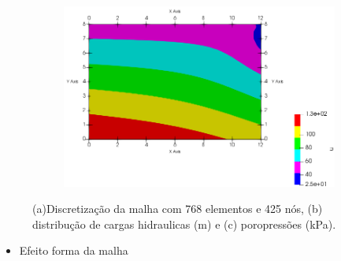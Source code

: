 \documentclass{article} %
\begin{document}
\begin{figure}[H]
\begin{subfigure}[b]{0.49\textwidth}
		\includegraphics[width=\textwidth]{option1_bu}
		\caption{}
		\label{}
	\end{subfigure}
	\caption{(a)Discretização da malha com 768 elementos e 425 nós, (b) distribução de cargas hidraulicas (m) e (c) poropressões (kPa).}\label{}
\end{figure}

\begin{itemize}
	\item Efeito forma da malha
\end{itemize}
\end{document}
